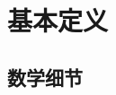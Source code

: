 \section{基本定义}\label{sec:11-2}

\begin{definition}\label{def:11-1}
	
\end{definition}

\begin{game}[语义安全性]\label{game:11-1}
	
\end{game}

\begin{definition}[语义安全性]\label{def:11-2}
	
\end{definition}

\subsection{数学细节}\label{subsec:11-2-1}

\begin{definition}[公钥加密方案]\label{def:11-3}
	
\end{definition}